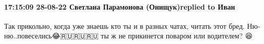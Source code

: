  
 
 
 
 

\paragraph{17:15:09 28-08-22 Светлана Парамонова (Онищук)replied to Иван}

Так прикольно, когда уже знаешь кто ты и в разных чатах, читать этот бред.
Ню-ню..повеселись😂🇷🇺🇷🇺🇷🇺 ты ж не прикинется поваром или водителем? 😆

